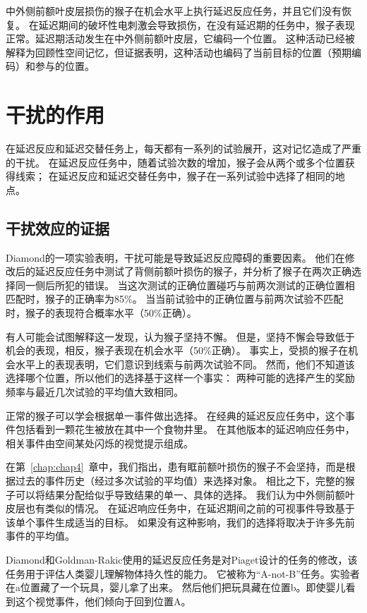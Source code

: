 中外侧前额叶皮层损伤的猴子在机会水平上执行延迟反应任务，并且它们没有恢复。
在延迟期间的破坏性电刺激会导致损伤，在没有延迟期的任务中，猴子表现正常。延迟期活动发生在中外侧前额叶皮层，它编码一个位置。
这种活动已经被解释为回顾性空间记忆，但证据表明，这种活动也编码了当前目标的位置（预期编码）和参与的位置。



\section{干扰的作用}

在延迟反应和延迟交替任务上，每天都有一系列的试验展开，这对记忆造成了严重的干扰。
在延迟反应任务中，随着试验次数的增加，猴子会从两个或多个位置获得线索；
在延迟反应和延迟交替任务中，猴子在一系列试验中选择了相同的地点。



\subsection{干扰效应的证据}

Diamond\cite{diamond1989comparison}的一项实验表明，干扰可能是导致延迟反应障碍的重要因素。
他们在修改后的延迟反应任务中测试了背侧前额叶损伤的猴子，并分析了猴子在两次正确选择同一侧后所犯的错误。
当这次测试的正确位置碰巧与前两次测试的正确位置相匹配时，猴子的正确率为85\%。
当当前试验中的正确位置与前两次试验不匹配时，猴子的表现符合概率水平（50\%正确）。


有人可能会试图解释这一发现，认为猴子坚持不懈。
但是，坚持不懈会导致低于机会的表现，相反，猴子表现在机会水平（50\%正确）。
事实上，受损的猴子在机会水平上的表现表明，它们意识到线索与前两次试验不同。
然而，他们不知道该选择哪个位置，所以他们的选择基于这样一个事实：
两种可能的选择产生的奖励频率与最近几次试验的平均值大致相同。


正常的猴子可以学会根据单一事件做出选择。
在经典的延迟反应任务中，这个事件包括看到一颗花生被放在其中一个食物井里。
在其他版本的延迟响应任务中，相关事件由空间某处闪烁的视觉提示组成。


在第~\ref{chap:chap4}~章中，我们指出，患有眶前额叶损伤的猴子不会坚持，而是根据过去的事件历史（经过多次试验的平均值）来选择对象。
相比之下，完整的猴子可以将结果分配给似乎导致结果的单一、具体的选择。
我们认为中外侧前额叶皮层也有类似的情况。
在延迟响应任务中，在延迟期间之前的可视事件导致基于该单个事件生成适当的目标。
如果没有这种影响，我们的选择将取决于许多先前事件的平均值。


Diamond和Goldman-Rakic使用的延迟反应任务是对Piaget\cite{piaget1955construction}设计的任务的修改，该任务用于评估人类婴儿理解物体持久性的能力。
它被称为“A-not-B”任务。实验者在a位置藏了一个玩具，婴儿拿了出来。
然后他们把玩具藏在位置b。即使婴儿看到这个视觉事件，他们倾向于回到位置A\cite{harris1989object}。


